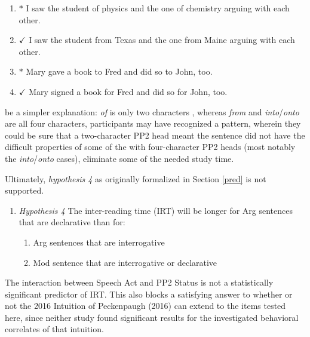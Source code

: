 \documentclass[12pt,oneside]{book}
\providecommand{\tightlist}{%
  \setlength{\itemsep}{0pt}\setlength{\parskip}{0pt}}
\begin{document}
\begin{enumerate}
\def\labelenumi{(\arabic{enumi})}
\setcounter{enumi}{44}
\item
  \(*\) I saw the student of physics and the one of chemistry arguing with each other.
\item
  \(\checkmark\) I saw the student from Texas and the one from Maine arguing with each other.
\item
  \(*\) Mary gave a book to Fred and did so to John, too.
\item
  \(\checkmark\) Mary signed a book for Fred and did so for John, too.
\end{enumerate}

 be a simpler explanation:  \emph{of} is only two characters , whereas \emph{from} and \emph{into}/\emph{onto} are all four characters, participants may have recognized a pattern, wherein they could be sure that a two-character PP2 head meant the sentence did not have the difficult properties of some of the  with four-character PP2 heads (most notably the \emph{into}/\emph{onto} cases),  eliminate some of the needed study time.

Ultimately, \emph{hypothesis 4} as originally formalized in Section \ref{pred} is not supported.

\begin{enumerate}
\def\labelenumi{(\arabic{enumi})}
\setcounter{enumi}{48}
\tightlist
\item
  \emph{Hypothesis 4}
  The inter-reading time (IRT) will be longer for Arg sentences that are declarative than for:

  \begin{enumerate}
  \def\labelenumii{\alph{enumii}.}
  \tightlist
  \item
    Arg sentences that are interrogative
  \item
    Mod sentence that are interrogative or declarative
  \end{enumerate}
\end{enumerate}

The interaction between Speech Act and PP2 Status is not a statistically significant predictor of IRT. This also blocks a satisfying answer to whether or not the 2016 Intuition of Peckenpaugh (2016) can extend to the items tested here, since neither study found significant results for the investigated behavioral correlates of that intuition.
\end{document}
